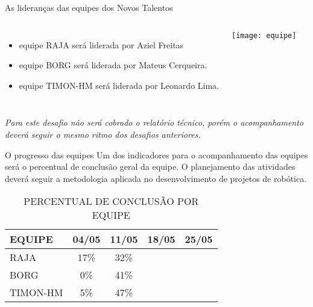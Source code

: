 \begin{frame}[t]{As lideranças das equipes dos Novos Talentos}
    \vspace{0.5cm}
    \begin{columns}
            \begin{itemize}
                \item equipe RAJA será liderada por Aziel Freitas
                \item equipe BORG será liderada por Mateus Cerqueira.
                \item equipe TIMON-HM será liderada por Leonardo Lima.
            \end{itemize}
            \texttt{[image: equipe]}
    \end{columns}
    \vspace{1cm}
    
    \emph{Para este desafio não será cobrado o relatório técnico, porém o acompanhamento deverá seguir o mesmo ritmo dos desafios anteriores.}
\end{frame}
\begin{frame}[t]{O progresso das equipes}
    Um dos indicadores para o acompanhamento das equipes será o percentual de conclusão geral da equipe.
    O planejamento das atividades deverá seguir a metodologia aplicada no desenvolvimento de projetos de robótica.
    \newline
    \begin{table}[ht!]
    \centering
        \caption{PERCENTUAL DE CONCLUSÃO POR EQUIPE}
        \begin{tabular}{|l|c|c|c|c|} \hline
            \textbf{EQUIPE}&\textbf{04/05}&\textbf{11/05}&\textbf{18/05}&\textbf{25/05}\\ \hline
            RAJA & 17\% &32\% & &  \\ \hline
            BORG & 0\% &41\% & &  \\ \hline
            TIMON-HM & 5\% &47\% & &  \\ \hline
        \end{tabular}
    \end{table}
\end{frame}
